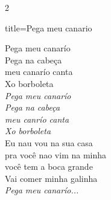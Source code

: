 \documentclass[fontsize=14pt, paper=a4, twoside, DIV=20]{scrreprt} %
\begin{document}
\begin{multicols*}{2}
\begin{song}{title={Pega meu canario}}
        \begin{verse*}
            Pega meu canarío\\
            Pega na cabeça\\
            meu canarío canta\\
            Xo borboleta\\
            \textit{Pega meu canarío}\\
            \textit{Pega na cabeça}\\
            \textit{meu canrío canta}\\
            \textit{Xo borboleta}\\
            Eu nau vou na sua casa\\
            pra você nao vim na minha\\
            você tem a boca grande\\
            Vai comer minha galinha\\
            \textit{Pega meu canarío...}\\
        \end{verse*}
\end{song}


\end{multicols*}
\end{document}

